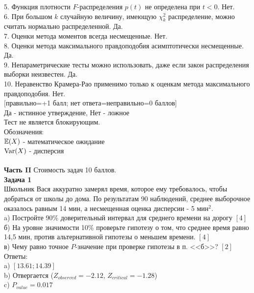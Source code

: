 \documentclass[pdftex,12pt,a4paper]{article}
\begin{document}
5. Функция плотности $F$-распределения $p(t)$ не определена при $t<0$.  Нет. \\

6. При большом $k$ случайную величину, имеющую $\chi_{k}^{2}$ распределение, можно считать нормально распределенной. Да.  \\

7. Оценки метода моментов всегда несмещенные.  Нет. \\

8. Оценки метода максимального правдоподобия асимптотически несмещенные. Да.  \\

9. Непараметрические тесты можно использовать, даже если закон распределения выборки неизвестен. Да.  \\

10. Неравенство Крамера-Рао применимо только к оценкам метода максимального правдоподобия. Нет. \\



$[$правильно=+1 балл; нет ответа=неправильно=0 баллов$]$ \\
Да - истинное утверждение, Нет - ложное \\
Тест не является блокирующим. \\
Обозначения: \\
$\mathbb{E}(X)$ - математическое ожидание \\
$\operatorname{Var}(X)$ - дисперсия \\ \\

\textbf{Часть II} Стоимость задач 10 баллов. \\

\textbf{Задача 1} \\ 
Школьник Вася аккуратно замерял время, которое ему требовалось, чтобы добраться от школы до дома. По результатам 90 наблюдений, среднее выборочное оказалось равным 14 мин, а несмещенная оценка дисперсии - 5 мин$^{2}$. \\
a) Постройте 90\% доверительный интервал для среднего времени на дорогу $[4]$ \\
б) На уровне значимости 10\% проверьте гипотезу о том, что среднее время равно 14,5 мин, против альтернативной гипотезы о меньшем времени. $[4]$ \\
в) Чему равно точное $P$-значение при проверке гипотезы в п. <<б>>? $[2]$ \\
Ответы: \\
a) $[13.61;14.39]$ \\
b) Отвергается ($Z_{observed}=-2.12$, $Z_{critical}=-1.28$) \\
c) $P_{value}=0.017$ \\
\end{document}
